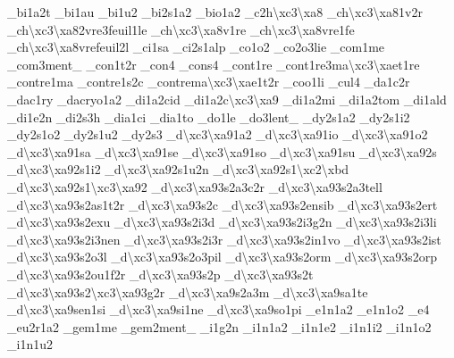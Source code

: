 \begin{DoxyCompactItemize}
\-\_\-bi1a2t \-\_\-bi1au \-\_\-bi1u2 \-\_\-bi2s1a2 \-\_\-bio1a2 \-\_\-c2h\textbackslash{}xc3\textbackslash{}xa8 \-\_\-ch\textbackslash{}xc3\textbackslash{}xa81v2r \-\_\-ch\textbackslash{}xc3\textbackslash{}xa82vre3feuil1le \-\_\-ch\textbackslash{}xc3\textbackslash{}xa8v1re \-\_\-ch\textbackslash{}xc3\textbackslash{}xa8vre1fe \-\_\-ch\textbackslash{}xc3\textbackslash{}xa8vrefeuil2l \-\_\-ci1sa \-\_\-ci2s1alp \-\_\-co1o2 \-\_\-co2o3lie \-\_\-com1me \-\_\-com3ment\-\_\- \-\_\-con1t2r \-\_\-con4 \-\_\-cons4 \-\_\-cont1re \-\_\-cont1re3ma\textbackslash{}xc3\textbackslash{}xaet1re \-\_\-contre1ma \-\_\-contre1s2c \-\_\-contrema\textbackslash{}xc3\textbackslash{}xae1t2r \-\_\-coo1li \-\_\-cul4 \-\_\-da1c2r \-\_\-dac1ry \-\_\-dacryo1a2 \-\_\-di1a2cid \-\_\-di1a2c\textbackslash{}xc3\textbackslash{}xa9 \-\_\-di1a2mi \-\_\-di1a2tom \-\_\-di1ald \-\_\-di1e2n \-\_\-di2s3h \-\_\-dia1ci \-\_\-dia1to \-\_\-do1le \-\_\-do3lent\-\_\- \-\_\-dy2s1a2 \-\_\-dy2s1i2 \-\_\-dy2s1o2 \-\_\-dy2s1u2 \-\_\-dy2s3 \-\_\-d\textbackslash{}xc3\textbackslash{}xa91a2 \-\_\-d\textbackslash{}xc3\textbackslash{}xa91io \-\_\-d\textbackslash{}xc3\textbackslash{}xa91o2 \-\_\-d\textbackslash{}xc3\textbackslash{}xa91sa \-\_\-d\textbackslash{}xc3\textbackslash{}xa91se \-\_\-d\textbackslash{}xc3\textbackslash{}xa91so \-\_\-d\textbackslash{}xc3\textbackslash{}xa91su \-\_\-d\textbackslash{}xc3\textbackslash{}xa92s \-\_\-d\textbackslash{}xc3\textbackslash{}xa92s1i2 \-\_\-d\textbackslash{}xc3\textbackslash{}xa92s1u2n \-\_\-d\textbackslash{}xc3\textbackslash{}xa92s1\textbackslash{}xc2\textbackslash{}xbd \-\_\-d\textbackslash{}xc3\textbackslash{}xa92s1\textbackslash{}xc3\textbackslash{}xa92 \-\_\-d\textbackslash{}xc3\textbackslash{}xa93s2a3c2r \-\_\-d\textbackslash{}xc3\textbackslash{}xa93s2a3tell \-\_\-d\textbackslash{}xc3\textbackslash{}xa93s2as1t2r \-\_\-d\textbackslash{}xc3\textbackslash{}xa93s2c \-\_\-d\textbackslash{}xc3\textbackslash{}xa93s2ensib \-\_\-d\textbackslash{}xc3\textbackslash{}xa93s2ert \-\_\-d\textbackslash{}xc3\textbackslash{}xa93s2exu \-\_\-d\textbackslash{}xc3\textbackslash{}xa93s2i3d \-\_\-d\textbackslash{}xc3\textbackslash{}xa93s2i3g2n \-\_\-d\textbackslash{}xc3\textbackslash{}xa93s2i3li \-\_\-d\textbackslash{}xc3\textbackslash{}xa93s2i3nen \-\_\-d\textbackslash{}xc3\textbackslash{}xa93s2i3r \-\_\-d\textbackslash{}xc3\textbackslash{}xa93s2in1vo \-\_\-d\textbackslash{}xc3\textbackslash{}xa93s2ist \-\_\-d\textbackslash{}xc3\textbackslash{}xa93s2o3l \-\_\-d\textbackslash{}xc3\textbackslash{}xa93s2o3pil \-\_\-d\textbackslash{}xc3\textbackslash{}xa93s2orm \-\_\-d\textbackslash{}xc3\textbackslash{}xa93s2orp \-\_\-d\textbackslash{}xc3\textbackslash{}xa93s2ou1f2r \-\_\-d\textbackslash{}xc3\textbackslash{}xa93s2p \-\_\-d\textbackslash{}xc3\textbackslash{}xa93s2t \-\_\-d\textbackslash{}xc3\textbackslash{}xa93s2\textbackslash{}xc3\textbackslash{}xa93g2r \-\_\-d\textbackslash{}xc3\textbackslash{}xa9s2a3m \-\_\-d\textbackslash{}xc3\textbackslash{}xa9sa1te \-\_\-d\textbackslash{}xc3\textbackslash{}xa9sen1si \-\_\-d\textbackslash{}xc3\textbackslash{}xa9si1ne \-\_\-d\textbackslash{}xc3\textbackslash{}xa9so1pi \-\_\-e1n1a2 \-\_\-e1n1o2 \-\_\-e4 \-\_\-eu2r1a2 \-\_\-gem1me \-\_\-gem2ment\-\_\- \-\_\-i1g2n \-\_\-i1n1a2 \-\_\-i1n1e2 \-\_\-i1n1i2 \-\_\-i1n1o2 \-\_\-i1n1u2 
\end{DoxyCompactItemize}
